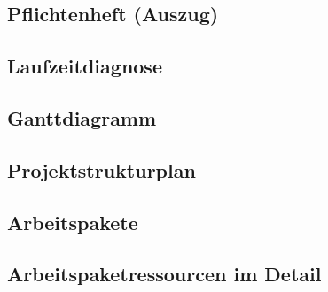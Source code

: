\documentclass[11pt,toc=sectionentrywithoutdots, headheight=44pt, headings=optiontoheadandtoc]{scrartcl}
\begin{document}
\subsection{Pflichtenheft (Auszug)}
\blindtext

\subsection{Laufzeitdiagnose}
\blindtext

\subsection{Ganttdiagramm}
\blindtext

\subsection{Projektstrukturplan}
\blindtext

\subsection{Arbeitspakete}
\blindtext

\subsection{Arbeitspaketressourcen im Detail}
\blindtext
\end{document}
